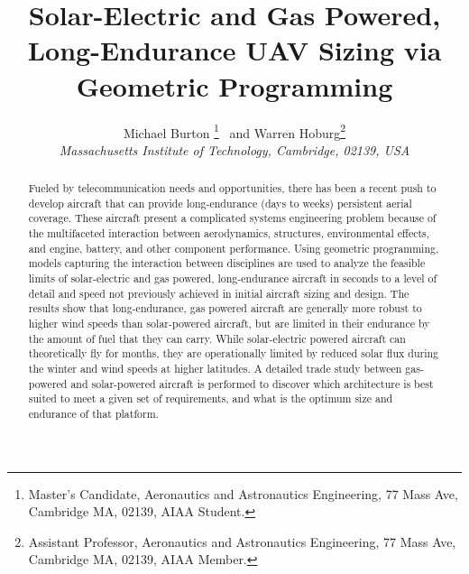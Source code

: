 \usepackage{bm}
\title{Solar-Electric and Gas Powered, Long-Endurance UAV Sizing via Geometric Programming}

 \author{
  Michael Burton \thanks{Master's Candidate, Aeronautics and Astronautics Engineering, 77 Mass Ave, Cambridge MA, 02139, AIAA Student.}
  \ and Warren Hoburg\thanks{Assistant Professor, Aeronautics and Astronautics Engineering, 77 Mass Ave, Cambridge MA, 02139, AIAA Member.}\\
  {\normalsize\itshape
   Massachusetts Institute of Technology, Cambridge, 02139, USA}\\
 }


 \newcommand{\eqnref}[1]{(\ref{#1})}
 \newcommand{\class}[1]{\texttt{#1}}
 \newcommand{\package}[1]{\texttt{#1}}
 \newcommand{\file}[1]{\texttt{#1}}
 \newcommand{\BibTeX}{\textsc{Bib}\TeX}
 \usepackage{hyperref}
 \hypersetup{citecolor = blue}



\graphicspath{{./figs/}} 
\maketitle

\begin{abstract}
    Fueled by telecommunication needs and opportunities, there has been a recent push to develop aircraft that can provide long-endurance (days to weeks) persistent aerial coverage.
    These aircraft present a complicated systems engineering problem because of the multifaceted interaction between aerodynamics, structures, environmental effects, and engine, battery, and other component performance.
    Using geometric programming, models capturing the interaction between disciplines are used to analyze the feasible limits of solar-electric and gas powered, long-endurance aircraft in seconds to a level of detail and speed not previously achieved in initial aircraft sizing and design. 
    The results show that long-endurance, gas powered aircraft are generally more robust to higher wind speeds than solar-powered aircraft, but are limited in their endurance by the amount of fuel that they can carry. 
    While solar-electric powered aircraft can theoretically fly for months, they are operationally limited by reduced solar flux during the winter and wind speeds at higher latitudes.
    A detailed trade study between gas-powered and solar-powered aircraft is performed to discover which architecture is best suited to meet a given set of requirements, and what is the optimum size and endurance of that platform.
\end{abstract}

